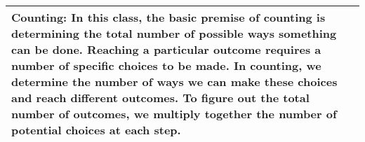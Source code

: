 {\tabulinesep=1mm
\begin{tabu}{|p{16cm} |}
 \hline
 \vspace{1 mm}
\textbf{Counting:} \newline
In this class, the basic premise of counting is determining the total number of possible ways something can be done. Reaching a particular outcome requires a number of specific choices to be made. In counting, we determine the number of ways we can make these choices and reach different outcomes. To figure out the total number of outcomes, we multiply together the number of potential choices at each step. \newline
\\
\hline
 \end{tabu}
}